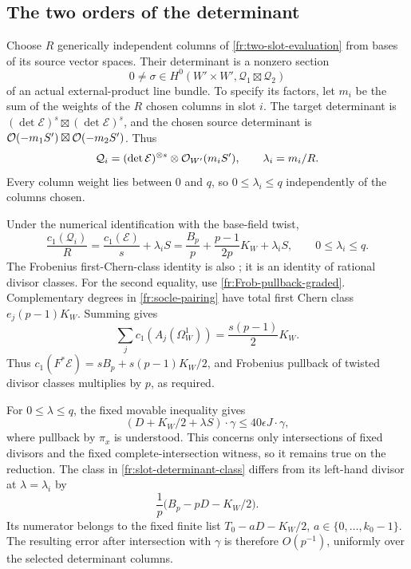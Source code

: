 \subsection{The two orders of the determinant}
\label{fr:determinant}

Choose $R$ generically independent columns of
\eqref{fr:two-slot-evaluation} from bases of its source vector spaces.
Their determinant is a nonzero section
\[
 0\ne\sigma\in H^0(W'\times W',\mathcal Q_1\boxtimes\mathcal Q_2)
\]
of an actual external-product line bundle. To specify its factors,
let $m_i$ be the sum of the weights of the $R$ chosen columns in
slot $i$. The target determinant is
$(\det\mathcal E)^s\boxtimes(\det\mathcal E)^s$, and the
chosen source determinant is
$\mathcal O(-m_1S')\boxtimes\mathcal O(-m_2S')$. Thus
\[
 \mathcal Q_i=(\det\mathcal E)^{\otimes s}
                 \otimes\mathcal O_{W'}(m_iS'),\qquad
 \lambda_i=m_i/R.
\]
Every column weight lies between $0$ and $q$, so
$0\le\lambda_i\le q$ independently of the columns chosen.

Under the numerical identification with the base-field twist,
\begin{equation}\label{fr:slot-determinant-class}
 \frac{c_1(\mathcal Q_i)}R
 =\frac{c_1(\mathcal E)}s+\lambda_iS
 =\frac{B_p}p+\frac{p-1}{2p}K_W+\lambda_iS,
 \qquad 0\le\lambda_i\le q.
\end{equation}
The Frobenius first-Chern-class identity is also
\cite[Lemma~4.2]{Sun}; it is an identity of rational divisor classes.  For the second equality, use
\eqref{fr:Frob-pullback-graded}.  Complementary degrees in
\eqref{fr:socle-pairing} have total first Chern class
$e_j(p-1)K_W$.  Summing gives
\[
 \sum_jc_1(A_j(\Omega_W^1))=\frac{s(p-1)}2K_W.
\]
Thus $c_1(F^*\mathcal E)=sB_p+s(p-1)K_W/2$, and Frobenius pullback of
twisted divisor classes multiplies by $p$, as required.

For $0\le\lambda\le q$, the fixed movable inequality gives
\[
 (D+K_W/2+\lambda S)\cdot\gamma\le40\epsilon J\cdot\gamma,
\]
where pullback by $\pi_x$ is understood. This concerns only
intersections of fixed divisors and the fixed complete-intersection
witness, so it remains true on the reduction. The class in
\eqref{fr:slot-determinant-class} differs from its
left-hand divisor at $\lambda=\lambda_i$ by
\[
 \frac1p\bigl(B_p-pD-K_W/2\bigr).
\]
Its numerator belongs to the fixed finite list
$T_0-aD-K_W/2$, $a\in\{0,\ldots,k_0-1\}$. The resulting error after
intersection with $\gamma$ is therefore $O(p^{-1})$, uniformly
over the selected determinant columns.

